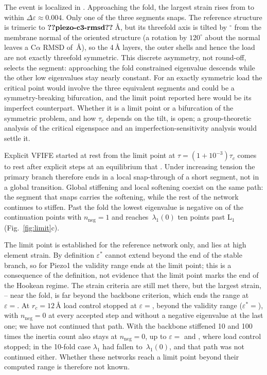\documentclass[preprint,12pt,a4paper]{elsarticle}
\newcommand{\eps}{\varepsilon}
\begin{document}
The event is localized in . Approaching the fold, the largest strain rises from  to  within $\Delta\eps\approx0.004$. Only one of the three segments snaps. The reference structure is trimeric to $\V{piezo-c3-rmsd}$\,\AA, but its threefold axis is tilted by $^\circ$ from the membrane normal of the oriented structure (a rotation by $120^\circ$ about the normal leaves a C$\alpha$ RMSD of \,\AA), so the 4\,\AA{} layers, the outer shells and hence the load are not exactly threefold symmetric. This discrete asymmetry, not round-off, selects the segment: approaching the fold  constrained eigenvalue descends while the other low eigenvalues stay nearly constant. For an exactly symmetric load the critical point would involve the three equivalent segments and could be a symmetry-breaking bifurcation, and the limit point reported here would be its imperfect counterpart. Whether it is a limit point or a bifurcation of the symmetric problem, and how $\tau_c$ depends on the tilt, is open; a group-theoretic analysis of the critical eigenspace \citep{healey1988} and an imperfection-sensitivity analysis \citep{ikeda2010} would settle it.

Explicit VFIFE started at rest from the limit point at $\tau=(1+10^{-3})\tau_c$ comes to rest after  explicit steps at an equilibrium that . Under increasing tension the primary branch therefore ends in a local snap-through of a short segment, not in a global transition. Global stiffening and local softening coexist on the same path: the segment that snaps carries the softening, while the rest of the network continues to stiffen. Past the fold the lowest eigenvalue is negative on  of the  continuation points with $n_{\mathrm{neg}}=1$ and reaches \,$\lambda_1(0)$ ten points past L$_1$ (Fig.~\ref{fig:limit}c).

The limit point is established for the reference network only, and lies at high element strain. By definition $\eps^*$ cannot extend beyond the end of the stable branch, so for Piezo1 the validity range ends at the limit point; this is a consequence of the definition, not evidence that the limit point marks the end of the Hookean regime. The strain criteria are still met there, but the largest strain, -- near the fold, is far beyond the backbone criterion, which ends the range at $\eps=$. At $r_c=12$\,\AA{} load control stopped at $\eps=$, beyond the validity range ($\eps^*=$), with $n_{\mathrm{neg}}=0$ at every accepted step and without a negative eigenvalue at the last one; we have not continued that path. With the backbone stiffened 10 and 100 times the inertia count also stays at $n_{\mathrm{neg}}=0$, up to $\eps=$ and , where load control stopped; in the 10-fold case $\lambda_1$ had fallen to \,$\lambda_1(0)$, and that path was not continued either. Whether these networks reach a limit point beyond their computed range is therefore not known.
\end{document}
